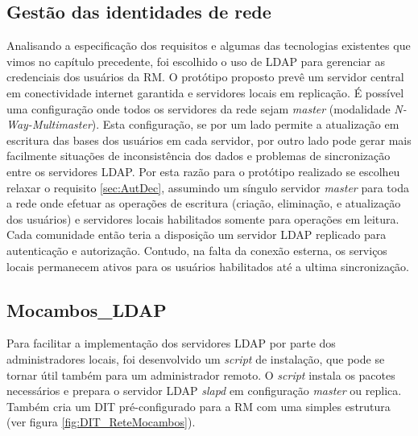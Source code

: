 \subsection{Gestão das identidades de rede}
Analisando a especificação dos requisitos e algumas das tecnologias
existentes que vimos no capítulo precedente, foi escolhido o uso de
LDAP para gerenciar as credenciais dos usuários da RM. O protótipo
proposto prevê um servidor central em conectividade internet garantida
e servidores locais em replicação. É possível uma configuração onde
todos os servidores da rede sejam \emph{master} (modalidade
\emph{N-Way-Multimaster}). Esta configuração, se por um lado permite a
atualização em escritura das bases dos usuários em cada servidor, por
outro lado pode gerar mais facilmente situações de inconsistência dos
dados e problemas de sincronização entre os servidores LDAP. Por esta
razão para o protótipo realizado se escolheu relaxar o requisito
\ref{sec:AutDec}, assumindo um síngulo servidor \emph{master} para
toda a rede onde efetuar as operações de escritura (criação,
eliminação, e atualização dos usuários) e servidores locais
habilitados somente para operações em leitura. Cada comunidade então
teria a disposição um servidor LDAP replicado para autenticação e
autorização. Contudo, na falta da conexão esterna, os serviços locais
permanecem ativos para os usuários habilitados até a ultima
sincronização. 

\subsection{Mocambos\_LDAP}\label{MocambosLDAP}

Para facilitar a implementação dos servidores LDAP por parte dos
administradores locais, foi desenvolvido um \emph{script} de
instalação, que pode se tornar útil também para um administrador
remoto. O \emph{script} instala os pacotes necessários e prepara o
servidor LDAP \emph{slapd} em configuração \emph{master} ou
replica. Também cria um DIT pré-configurado para a RM com uma simples
estrutura (ver figura \ref{fig:DIT_ReteMocambos}).


